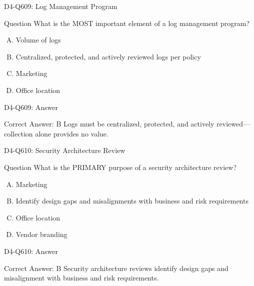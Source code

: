\documentclass{beamer}
\begin{document}
	\begin{frame}{D4-Q609: Log Management Program}
		\begin{block}{Question}
			What is the MOST important element of a log management program?
		\end{block}
		\begin{enumerate}[(A)]
			\item Volume of logs
			\item Centralized, protected, and actively reviewed logs per policy
			\item Marketing
			\item Office location
		\end{enumerate}
	\end{frame}
	\begin{frame}{D4-Q609: Answer}
		\begin{block}{Correct Answer: B}
			Logs must be centralized, protected, and actively reviewed—collection alone provides no value.
		\end{block}
	\end{frame}
	
	\begin{frame}{D4-Q610: Security Architecture Review}
		\begin{block}{Question}
			What is the PRIMARY purpose of a security architecture review?
		\end{block}
		\begin{enumerate}[(A)]
			\item Marketing
			\item Identify design gaps and misalignments with business and risk requirements
			\item Office location
			\item Vendor branding
		\end{enumerate}
	\end{frame}
	\begin{frame}{D4-Q610: Answer}
		\begin{block}{Correct Answer: B}
			Security architecture reviews identify design gaps and misalignment with business and risk requirements.
		\end{block}
	\end{frame}
	
\end{document}
